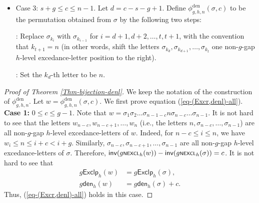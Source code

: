\documentclass[12pt]{article}
\begin{document}
\begin{framed}
\begin{itemize}[leftmargin=1.5em]
		\item[$\bullet$] Case 3: $s+g\leq c\leq n-1$. 
		Let $d=c-s-g+1$. 
		Define $\phi_{g,h,n}^{\text{den}}(\sigma,c)$  to be the permutation obtained from $\sigma$ by the following two steps:
		
		\textbf{}: Replace $\sigma_{k_{i}}$ with $\sigma_{k_{i-1}}$ for $i=d+1,d+2,\ldots,t,t+1$, with the convention that $k_{t+1}=n$
		(in other words, shift the letters $\sigma_{k_{d}},\sigma_{k_{d+1}},\ldots,\sigma_{k_{t}}$  one non-$g$-gap $h$-level excedance-letter position to the right).
		
		\textbf{}: Set the $k_{d}$-th letter to be $n$.    
	\end{itemize}
\end{framed}
\begin{proof}[Proof of Theorem \ref{Thm-bijection-denl}]
We keep the notation of the construction of $\phi_{g,h,n}^{\text{den}}$.
Let $w=\phi_{g,h,n}^{\text{den}}(\sigma,c)$. 
We first prove equation (\ref{eq-(Excr,denl)-all}).
\\
\noindent \textbf{Case 1:} $0\leq c\leq g-1$. 
Note that $w=\sigma_{1}\sigma_{2}\ldots\sigma_{n-1-c}n\sigma_{n-c}\ldots\sigma_{n-1}$.
It is not hard to see that the letters 
$w_{n-c},w_{n-c+1},\ldots,w_{n}$
(i.e., the letters $n,\sigma_{n-c},\ldots,\sigma_{n-1}$)
are all non-$g$-gap $h$-level excedance-letters of $w$.
Indeed, for $n-c\leq i\leq n$,
we have $w_{i}\leq n\leq i+c<i+g$.
Similarly, $\sigma_{n-c},\sigma_{n-c+1},\ldots,\sigma_{n-1}$ are all non-$g$-gap $h$-level excedance-letters of $\sigma$.
Therefore, $\textsf{inv}(g\textsf{\scriptsize{NEXCL}}_{h}(w))-\textsf{inv}(g\textsf{\scriptsize{NEXCL}}_{h}(\sigma))=c$.
It is not hard to see that
\begin{align*}
	g\textsf{Exclp}_{h}(w)&=g\textsf{Exclp}_{h}(\sigma), \\
	g\textsf{den}_{h}(w)&=g\textsf{den}_{h}(\sigma)+c.
\end{align*}
Thus, (\ref{eq-(Excr,denl)-all}) holds in this case.


\end{proof}
\end{document}
